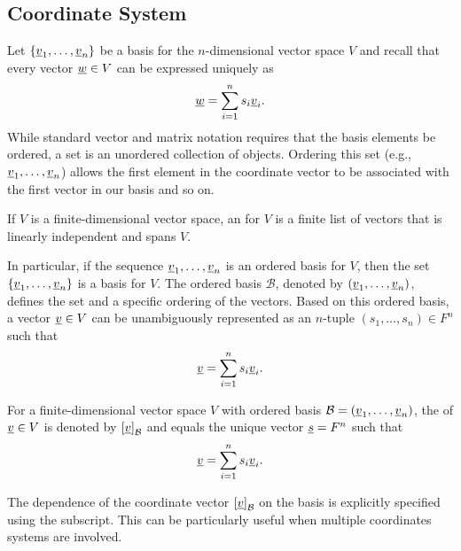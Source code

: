 \subsection{Coordinate System}

Let $\left\{ \underline{v}_1, \ldots, \underline{v}_n \right\}$ be a basis for the $n$-dimensional vector space $V$ and recall that every vector $\underline{w} \in V$ can be expressed uniquely as
\begin{equation*}
\underline{w} = \sum_{i=1}^n s_i \underline{v}_i.
\end{equation*}
While standard vector and matrix notation requires that the basis elements be ordered, a set is an unordered collection of objects.
Ordering this set (e.g., $\underline{v}_1, \ldots, \underline{v}_n$) allows the first element in the coordinate vector to be associated with the first vector in our basis and so on.


\begin{definition}
If $V$ is a finite-dimensional vector space, an  for $V$ is a finite list of vectors that is linearly independent and spans $V$.
\end{definition}

In particular, if the sequence $\underline{v}_1, \ldots, \underline{v}_n$ is an ordered basis for $V$, then the set $\left\{ \underline{v}_1, \ldots, \underline{v}_n \right\}$ is a basis for $V$.
The ordered basis $\mathcal{B}$, denoted by $\left( \underline{v}_1, \ldots, \underline{v}_n \right)$, defines the set and a specific ordering of the vectors.
Based on this ordered basis, a vector $\underline{v} \in V$ can be unambiguously represented as an $n$-tuple $(s_1, \ldots, s_n)\in F^n$ such that 
\begin{equation*}
\underline{v} = \sum_{i=1}^n s_i \underline{v}_i.
\end{equation*}

\begin{definition}
For a finite-dimensional vector space $V$ with ordered basis $\mathcal{B}=(\underline{v}_1, \ldots, \underline{v}_n )$, the  of $\underline{v} \in V$ is denoted by $\left[ \underline{v} \right]_{\mathcal{B}}$ and equals the unique vector $\underline{s} = F^n$ such that
\[ \underline{v} = \sum_{i=1}^n s_i \underline{v}_i. \]  
\end{definition}

The dependence of the coordinate vector $\left[ \underline{v} \right]_{\mathcal{B}}$ on the basis is explicitly specified using the subscript.
This can be particularly useful when multiple coordinates systems are involved.

